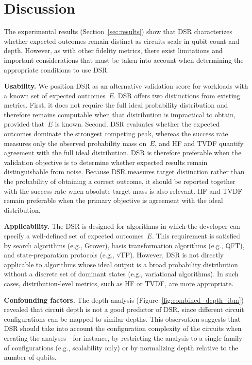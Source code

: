 \documentclass[10pt,conference]{IEEEtran}
\begin{document}
\section{Discussion}
\label{sec:discussion}

The experimental results (Section~\ref{sec:results}) show that DSR characterizes whether expected outcomes remain distinct as circuits scale in qubit count and depth. However, as with other fidelity metrics, there exist limitations and important considerations that must be taken into account when determining the appropriate conditions to use DSR.

\textbf{Usability.} We position DSR as an alternative validation score for workloads with a known set of expected outcomes~$E$. DSR offers two distinctions from existing metrics. First, it does not require the full ideal probability distribution and therefore remains computable when that distribution is impractical to obtain, provided that~$E$ is known. Second, DSR evaluates whether the expected outcomes dominate the strongest competing peak, whereas the success rate measures only the observed probability mass on~$E$, and HF and TVDF quantify agreement with the full ideal distribution. DSR is therefore preferable when the validation objective is to determine whether expected results remain distinguishable from noise. Because DSR measures target distinction rather than the probability of obtaining a correct outcome, it should be reported together with the success rate when absolute target mass is also relevant. HF and TVDF remain preferable when the primary objective is agreement with the ideal distribution.

\textbf{Applicability.} The DSR is designed for algorithms in which the developer can specify a well-defined set of expected outcomes~$E$. This requirement is satisfied by search algorithms (e.g., Grover), basis transformation algorithms (e.g., QFT), and state-preparation protocols (e.g., vTP). However, DSR is not directly applicable to algorithms whose ideal output is a broad probability distribution without a discrete set of dominant states (e.g., variational algorithms). In such cases, distribution-level metrics, such as HF or TVDF, are more appropriate.

\textbf{Confounding factors.} The depth analysis (Figure~\ref{fig:combined_depth_ibm}) revealed that circuit depth is not a good predictor of DSR, since different circuit configurations can be mapped to similar depths. This observation suggests that DSR should take into account the configuration complexity of the circuits when creating the analyses---for instance, by restricting the analysis to a single family of configurations (e.g., scalability only) or by normalizing depth relative to the number of qubits.
\end{document}
